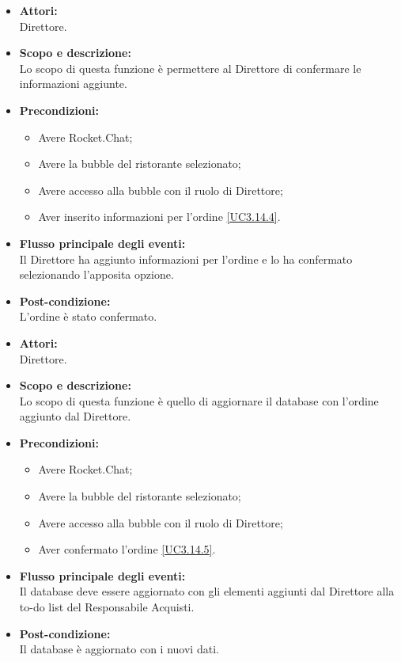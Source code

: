 
\begin{itemize}
	\item \textbf{Attori:}
	\\Direttore.
	\item \textbf{Scopo e descrizione:} 
	\\Lo scopo di questa funzione è permettere al Direttore di confermare le informazioni aggiunte.
	\item \textbf{Precondizioni:}
	\begin{itemize}
		\item Avere Rocket.Chat;
		\item Avere la bubble del ristorante selezionato;
		\item Avere accesso alla bubble con il ruolo di Direttore;
		\item Aver inserito informazioni per l'ordine \ref{UC3.14.4}.
	\end{itemize}
	\item \textbf{Flusso principale degli eventi:}
	\\Il Direttore ha aggiunto informazioni per l'ordine e lo ha confermato selezionando l'apposita opzione.
	\item \textbf{Post-condizione:}
	\\L'ordine è stato confermato.
\end{itemize}


\begin{itemize}
	\item \textbf{Attori:}
	\\Direttore.
	\item \textbf{Scopo e descrizione:} 
	\\Lo scopo di questa funzione è quello di aggiornare il database con l'ordine aggiunto dal Direttore.
	\item \textbf{Precondizioni:}
	\begin{itemize}
		\item Avere Rocket.Chat;
		\item Avere la bubble del ristorante selezionato;
		\item Avere accesso alla bubble con il ruolo di Direttore;
		\item Aver confermato l'ordine \ref{UC3.14.5}.
	\end{itemize}
	\item \textbf{Flusso principale degli eventi:}
	\\Il database deve essere aggiornato con gli elementi aggiunti dal Direttore alla to-do list del Responsabile Acquisti.
	\item \textbf{Post-condizione:}
	\\Il database è aggiornato con i nuovi dati.
\end{itemize}

